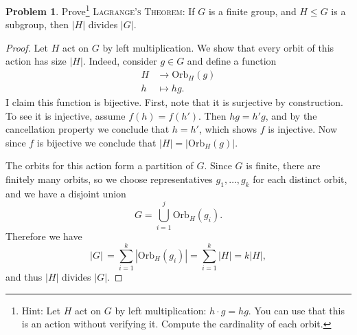 \documentclass[11pt]{article}
\theoremstyle{definition}
\newtheorem{problem}{Problem}
\begin{document}
\begin{problem} Prove\footnote{Hint: Let $H$ act on $G$ by left multiplication: $h \cdot g= hg$. You can use that this is an action without verifying it. Compute the cardinality of each orbit.} \textsc{Lagrange's Theorem:} If $G$ is a finite group, and $H\leq G$ is a subgroup, then $|H|$ divides $|G|$. 
\end{problem}

\begin{proof}
Let $H$ act on $G$ by left multiplication.
We show that every orbit of this action has size $|H|$. Indeed, consider $g\in G$ and define a function 
\[ \begin{aligned} H &\to \mathrm{Orb}_H(g)\\
h &\mapsto hg.\end{aligned}\]
I claim this function is bijective. First, note that it is surjective by construction. To see it is injective, assume $f(h)=f(h')$. Then $hg=h'g$, and by the cancellation property we conclude that $h=h'$, which shows $f$ is injective. Now since $f$ is bijective we conclude that $|H|=| \mathrm{Orb}_H(g)|$.

The orbits for this action form a partition of $G$. Since $G$ is finite, there are finitely many orbits, so we choose representatives $g_1, \ldots, g_k$ for each distinct orbit, and we have a disjoint union
$$G=\bigcup_{i=1}^j \mathrm{Orb}_H(g_i).$$ 
Therefore we have
$$|G|\,=\sum_{i=1}^k |\mathrm{Orb}_H(g_i)|=\sum_{i=1}^k |H|= k |H|,$$ 
and thus $|H|$ divides $|G|$. 
\end{proof}
\end{document}
